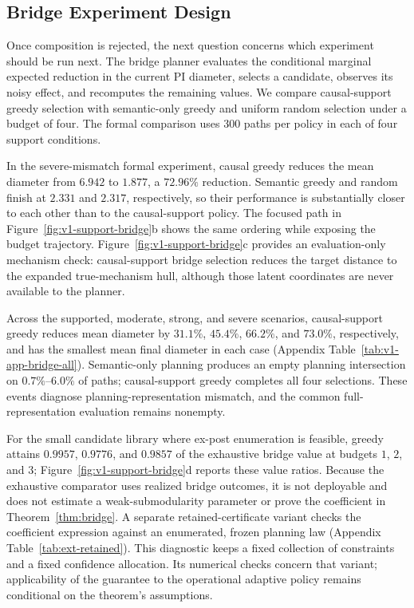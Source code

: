 \documentclass[11pt]{article}
\numberwithin{equation}{section}
\newcommand{\1}{\mathbf 1}
\begin{document}
\subsection{Bridge Experiment Design}
Once composition is rejected, the next question concerns which experiment should be run next.  The bridge planner evaluates the conditional marginal expected reduction in the current PI diameter, selects a candidate, observes its noisy effect, and recomputes the remaining values.  We compare causal-support greedy selection with semantic-only greedy and uniform random selection under a budget of four.  The formal comparison uses 300 paths per policy in each of four support conditions.

In the severe-mismatch formal experiment, causal greedy reduces the mean diameter from $6.942$ to $1.877$, a $72.96\%$ reduction.  Semantic greedy and random finish at $2.331$ and $2.317$, respectively, so their performance is substantially closer to each other than to the causal-support policy.  The focused path in Figure~\ref{fig:v1-support-bridge}b shows the same ordering while exposing the budget trajectory.  Figure~\ref{fig:v1-support-bridge}c provides an evaluation-only mechanism check: causal-support bridge selection reduces the target distance to the expanded true-mechanism hull, although those latent coordinates are never available to the planner.

Across the supported, moderate, strong, and severe scenarios, causal-support greedy reduces mean diameter by $31.1\%$, $45.4\%$, $66.2\%$, and $73.0\%$, respectively, and has the smallest mean final diameter in each case (Appendix Table~\ref{tab:v1-app-bridge-all}).  Semantic-only planning produces an empty planning intersection on $0.7\%$--$6.0\%$ of paths; causal-support greedy completes all four selections.  These events diagnose planning-representation mismatch, and the common full-representation evaluation remains nonempty.

For the small candidate library where ex-post enumeration is feasible, greedy attains $0.9957$, $0.9776$, and $0.9857$ of the exhaustive bridge value at budgets $1$, $2$, and $3$; Figure~\ref{fig:v1-support-bridge}d reports these value ratios.  Because the exhaustive comparator uses realized bridge outcomes, it is not deployable and does not estimate a weak-submodularity parameter or prove the coefficient in Theorem~\ref{thm:bridge}.
A separate retained-certificate variant checks the coefficient expression against an enumerated, frozen planning law (Appendix Table~\ref{tab:ext-retained}). This diagnostic keeps a fixed collection of constraints and a fixed confidence allocation. Its numerical checks concern that variant; applicability of the guarantee to the operational adaptive policy remains conditional on the theorem's assumptions.
\end{document}
